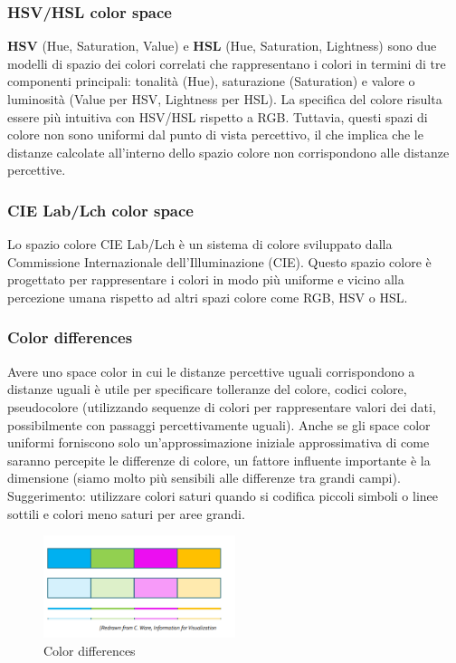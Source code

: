 \subsubsection{HSV/HSL color space}

\textbf{HSV} (Hue, Saturation, Value) e \textbf{HSL} (Hue, Saturation, Lightness) sono due modelli di spazio dei colori correlati che rappresentano i colori in termini di tre componenti principali: tonalità (Hue), saturazione (Saturation) e valore o luminosità (Value per HSV, Lightness per HSL).
La specifica del colore risulta essere più intuitiva con HSV/HSL rispetto a RGB. Tuttavia, questi spazi di colore non sono uniformi dal punto di vista percettivo, il che implica che le distanze calcolate all'interno dello spazio colore 
non corrispondono alle distanze percettive.
\subsubsection{CIE Lab/Lch color space}
Lo spazio colore CIE Lab/Lch è un sistema di colore sviluppato dalla Commissione Internazionale dell'Illuminazione (CIE). Questo spazio colore è progettato per rappresentare i colori in modo più uniforme e vicino alla percezione umana rispetto ad altri spazi 
colore come RGB, HSV o HSL.
\subsubsection{Color differences}
Avere uno space color in cui le distanze percettive uguali corrispondono a distanze uguali è utile per specificare tolleranze del colore, codici colore, pseudocolore (utilizzando sequenze di colori per rappresentare valori dei dati, possibilmente con passaggi percettivamente uguali).
Anche se gli space color uniformi forniscono solo un'approssimazione iniziale approssimativa di come saranno percepite le differenze di colore, un fattore influente importante è la dimensione (siamo molto più sensibili alle differenze tra grandi campi).
Suggerimento: utilizzare colori saturi quando si codifica piccoli simboli o linee sottili e colori meno saturi per aree grandi.
\begin{figure}[H]
    \centering
    \includegraphics[width=0.5\textwidth]{images/ColorDifferences.png} 
    \caption{Color differences}
    \label{fig:immagine}
\end{figure}
